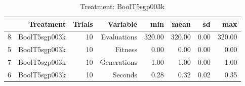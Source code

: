 \begin{table}[ht]
\centering
\begin{tabular}{rrrrrrrr}
  \hline
 & Treatment & Trials & Variable & min & mean & sd & max \\ 
  \hline
8 & BoolT5sgp003k &  10 & Evaluations & 320.00 & 320.00 & 0.00 & 320.00 \\ 
  5 & BoolT5sgp003k &  10 & Fitness & 0.00 & 0.00 & 0.00 & 0.00 \\ 
  7 & BoolT5sgp003k &  10 & Generations & 1.00 & 1.00 & 0.00 & 1.00 \\ 
  6 & BoolT5sgp003k &  10 & Seconds & 0.28 & 0.32 & 0.02 & 0.35 \\ 
   \hline
\end{tabular}
\caption{Treatment: BoolT5sgp003k} 
\end{table}
